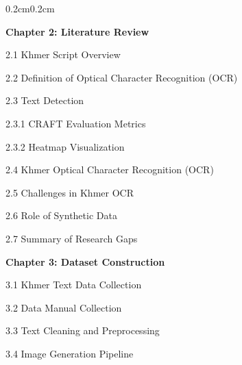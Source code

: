 {\begin{adjustwidth}{0.2cm}{0.2cm}
    \vspace{0.5cm}
    { \textbf{Chapter 2: Literature Review}\dotfill\pageref{ch:literature}\par}
    { \hspace{0.5cm} 2.1 Khmer Script Overview\dotfill\pageref{sec:Khmer-overview}\par}
    { \hspace{0.5cm} 2.2 Definition of Optical Character Recognition (OCR)\dotfill\pageref{sec:ocr-definition}\par}
    { \hspace{0.5cm} 2.3 Text Detection\dotfill\pageref{sec:text_detection_literature}\par}
    { \hspace{1cm} 2.3.1 CRAFT Evaluation Metrics\dotfill\pageref{subsec:craft-evaluation}\par}
    { \hspace{1cm} 2.3.2 Heatmap Visualization\dotfill\pageref{subsec:headmap_visualization}\par}
    { \hspace{0.5cm} 2.4 Khmer Optical Character Recognition (OCR)\dotfill\pageref{sec:khmer_OCR_literature}\par}
    { \hspace{0.5cm} 2.5 Challenges in Khmer OCR\dotfill\pageref{sec:datasets}\par}
    { \hspace{0.5cm} 2.6 Role of Synthetic Data\dotfill\pageref{sec:dl-models}\par}
    { \hspace{0.5cm} 2.7 Summary of Research Gaps\dotfill\pageref{sec:research-gaps}\par}

    \vspace{0.5cm}
    { \textbf{Chapter 3: Dataset Construction}\dotfill\pageref{ch:dataset}\par}
    { \hspace{0.5cm} 3.1 Khmer Text Data Collection\dotfill\pageref{sec:text-source}\par}
    { \hspace{0.5cm} 3.2 Data Manual Collection\dotfill\pageref{sec:manualcollection}\par}
    { \hspace{0.5cm} 3.3 Text Cleaning and Preprocessing\dotfill\pageref{sec:preprocessing}\par}
    { \hspace{0.5cm} 3.4 Image Generation Pipeline\dotfill\pageref{sec:generation}\par}


\end{adjustwidth}}

